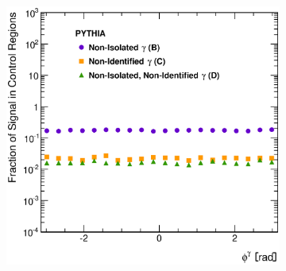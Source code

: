 \documentclass[12pt, twoside]{article}
\numberwithin{equation}{section}
\numberwithin{figure}{section}
\newenvironment{changemargin}[2]{%
\begin{list}{}{%
\setlength{\topsep}{0pt}%
\setlength{\leftmargin}{#1}%
\setlength{\rightmargin}{#2}%
\setlength{\listparindent}{\parindent}%
\setlength{\itemindent}{\parindent}%
\setlength{\parsep}{\parskip}%
}%
\item[]}{\end{list}}
\begin{document}
\begin{figure}
\begin{changemargin}{-1.0cm}{-0.75cm}
\begin{changemargin}{-0.75cm}{-1.0cm}
\begin{subfigure}[b]{0.37\textwidth}
            \subcaption{}
            \label{fig:SLFEtaPhoton}
        \end{subfigure}
        \begin{subfigure}[b]{0.37\textwidth}
            \includegraphics[width=\textwidth]{./images/SignalLeakageFractionsPythia/SLF-103.eps}
            \subcaption{}
            \label{fig:SLFPhiPhoton}
        \end{subfigure}


\end{changemargin}
\end{changemargin}
\end{figure}
\end{document}
